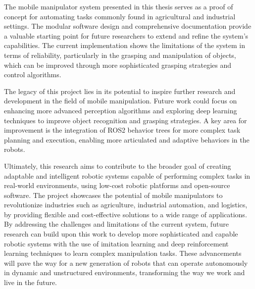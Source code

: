 The mobile manipulator system presented in this thesis serves as a proof of concept 
for automating tasks commonly found in agricultural and industrial settings. The modular software design and comprehensive
documentation provide a valuable starting point for future researchers to extend and refine the system's capabilities.
The current implementation shows the limitations of the system in terms of reliability, particularly in the grasping
and manipulation of objects, which can be improved through more sophisticated grasping strategies and control algorithms.

The legacy of this project lies in its potential to inspire further research and development in the field of mobile
manipulation. Future work could focus on enhancing more advanced perception algorithms
and exploring deep learning techniques to improve object recognition and grasping strategies.
A key area for improvement is the integration of ROS2 behavior trees for more complex task planning and execution,
enabling more articulated and adaptive behaviors in the robots.

Ultimately, this research aims to contribute to the broader goal of creating adaptable and intelligent robotic systems 
capable of performing complex tasks in real-world environments, using low-cost robotic platforms and open-source software.
The project showcases the potential of mobile manipulators to revolutionize industries such as agriculture, industrial automation,
and logistics, by providing flexible and cost-effective solutions to a wide range of applications. By addressing the challenges
and limitations of the current system, future research can build upon this work to develop more sophisticated and capable
robotic systems with the use of imitation learning and deep reinforcement learning techniques to learn complex manipulation tasks.
These advancements will pave the way for a new generation of robots that can operate autonomously in dynamic and unstructured
environments, transforming the way we work and live in the future.
